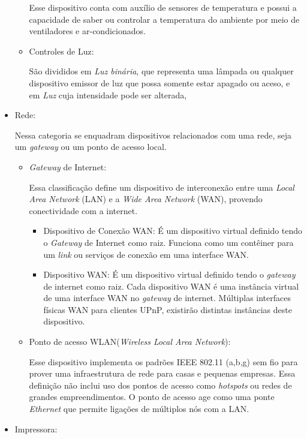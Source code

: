 \begin{itemize}
\begin{itemize}
			Esse dispositivo conta com auxílio de sensores de temperatura e possui a capacidade de saber ou controlar a temperatura do ambiente por meio de ventiladores e ar-condicionados.
		\item Controles de Luz:
			
			São divididos em \emph{Luz binária}, que representa uma lâmpada ou qualquer dispositivo emissor de luz que possa somente estar apagado ou aceso, e em \emph{Luz} cuja intensidade pode ser alterada, 
	\end{itemize}

\item Rede:

	Nessa categoria se enquadram dispositivos relacionados com uma rede, seja um \emph{gateway} ou um ponto de acesso local.
	\begin{itemize}
		\item \emph{Gateway} de Internet:
			
			Essa classificação define um dispositivo de interconexão entre uma \emph{Local Area Network} (LAN) e a \emph{Wide Area Network} (WAN), provendo conectividade com a internet.
			\begin{itemize}
				\item Dispositivo de Conexão WAN: É um dispositivo virtual definido tendo o \emph{Gateway} de Internet como raiz. Funciona como um contêiner para um \emph{link} ou serviços de conexão em uma interface WAN. 
				\item Dispositivo WAN: É um dispositivo virtual definido tendo o \emph{gateway} de internet como raiz. Cada dispositivo WAN é uma instância virtual de uma interface WAN no \emph{gateway} de internet. Múltiplas interfaces físicas WAN para clientes UPnP, existirão distintas instâncias deste dispositivo.
			\end{itemize}

		\item Ponto de acesso WLAN(\emph{Wireless Local Area Network}):
			
			Esse dispositivo implementa os padrões IEEE 802.11 (a,b,g) sem fio para prover uma infraestrutura de rede para casas e pequenas empresas. Essa definição não inclui uso dos pontos de acesso como \emph{hotspots} ou redes de grandes empreendimentos. O ponto de acesso age como uma ponte \emph{Ethernet} que permite ligações de múltiplos nós com a LAN.
	\end{itemize}

\item Impressora:


\end{itemize}
